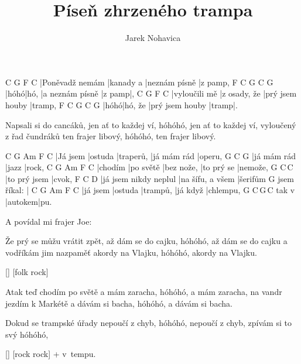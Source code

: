 \documentclass{song}
\author{Jarek Nohavica}
\title{Píseň zhrzeného trampa}
\begin{document}
\strophe
C               G         F             C
|Poněvadž nemám |kanady a |neznám písně |z pamp,
F    C    G               C      G
|hóhó|hó, |a neznám písně |z pamp|,
C             G            F               C
|vyloučili mě |z osady, že |prý jsem houby |tramp,
F    C       G               C     G
|hóhó|hó, že |prý jsem houby |tramp|.
\endstrophe

\strophe*
Napsali si do cancáků, jen ať to každej ví,
hóhóhó, jen ať to každej ví,
vyloučený z řad čundráků ten frajer libový,
hóhóhó, ten frajer libový.
\endstrophe

C        G       Am        F           C
|Já jsem |ostuda |traperů, |já mám rád |operu,
G           C     G
|já mám rád |jazz |rock,
C       G         Am         F          C
|chodím |po světě |bez nože, |to prý se |nemože,
G            C\,C\7
|to prý jsem |cvok,
F                     C                D\7
|já jsem nikdy neplul |na šífu, a všem |šerifům
            G
jsem říkal: |
C        G       Am       F        C
|já jsem |ostuda |trampů, |já když |chlempu,
      G       C\,G\,C
tak v |autokem|pu.
\endstrophe

\bigskip

\begin{multicols}{2}
\strophe*
A povídal mi frajer Joe: 
\endstrophe

\strophe*
Že prý se můžu vrátit zpět, až dám se do cajku,
hóhóhó, až dám se do cajku
a vodříkám jim nazpaměť akordy na Vlajku,
hóhóhó, akordy na Vlajku.
\endstrophe

\ref{} [folk rock]

\strophe*
Atak teď chodím po světě a mám zaracha,
hóhóhó, a mám zaracha,
na vandr jezdím k Markétě a dávám si bacha,
hóhóhó, a dávám si bacha.
\endstrophe

\strophe*
Dokud se trampské úřady nepoučí z chyb,
hóhóhó, nepoučí z chyb,
zpívám si to svý 
hóhóhó, 
\endstrophe

\ref{} [rock rock] + v~tempu.
\end{multicols}
\end{document}
